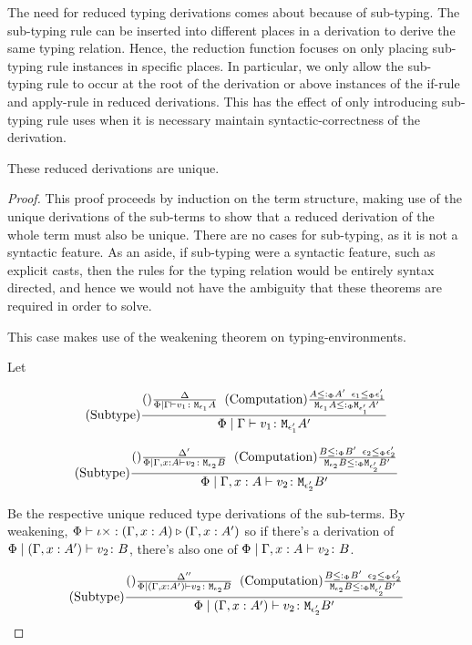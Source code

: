 \documentclass{Report}
\begin{document}
The need for reduced typing derivations comes about because of sub-typing. The sub-typing rule can be inserted into different places in a derivation to derive the same typing relation. Hence, the reduction function focuses on only placing sub-typing rule instances in specific places. In particular, we only allow the sub-typing rule to occur at the root of the derivation or above instances of the if-rule and apply-rule in reduced derivations. This has the effect of only introducing sub-typing rule uses when it is necessary maintain syntactic-correctness of the derivation.

\begin{theorem}
    These reduced derivations are unique.    
\end{theorem}

\begin{proof}
    This proof proceeds by induction on the term structure, making use of the unique derivations of the sub-terms to show that a reduced derivation of the whole term must also be unique. There are no cases for sub-typing, as it is not a syntactic feature. As an aside, if sub-typing were a syntactic feature, such as explicit casts, then the rules for the typing relation would be entirely syntax directed, and hence we would not have the ambiguity that these theorems are required in order to solve.



     This case makes use of the weakening theorem on typing-environments.

    Let 

    \begin{equation}
        \edeltacrule{\G}{v_1}{\e_1}{A}{\e_1'}{A'}
    \end{equation}

    \begin{equation}
        \edeltacruleprime{\G, x:A}{v_2}{\e_2}{B}{\e_2'}{B'}
    \end{equation}

    Be the respective unique reduced type derivations of the sub-terms. By weakening, $\ewrel{\P}{\i\x}{(\G, x:A)}{(\G, x: A')}$ so if there's a derivation of $\etyperelation{\P}{(\G, x:A')}{v_2}{B}$, there's also one of $\etyperelation{\P}{\gax}{v_2}{B}$.

    \begin{equation}
        \edeltacruleprimeprime{(\G, x:A')}{v_2}{\e_2}{B}{\e_2'}{B'}
    \end{equation}


\end{proof}
\end{document}
